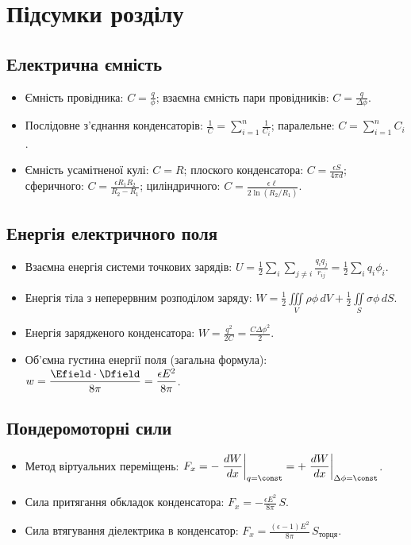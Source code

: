 \section{Підсумки розділу}

\subsection*{Електрична ємність}
\begin{itemize}
	\item Ємність провідника: $\displaystyle C = \frac{q}{\phi}$; взаємна ємність пари провідників: $\displaystyle C = \frac{q}{\Delta\phi}$.
	\item Послідовне з'єднання конденсаторів: $\displaystyle \frac1C = \sum\limits_{i=1}^n \frac1{C_i}$; паралельне: $\displaystyle C =
	      \sum\limits_{i=1}^n C_i$.
	\item Ємність усамітненої кулі: $C = R$; плоского конденсатора: $\displaystyle C = \frac{\epsilon S}{4\pi d}$; сферичного: $\displaystyle C =
	      \frac{\epsilon R_1R_2}{R_2-R_1}$; циліндричного: $\displaystyle C = \frac{\epsilon\ell}{2\ln(R_2/R_1)}$.
\end{itemize}

\subsection*{Енергія електричного поля}
\begin{itemize}
	\item Взаємна енергія системи точкових зарядів: $\displaystyle U = \frac12 \sum_{i}\sum_{j\neq i} \frac{q_iq_j}{r_{ij}} = \frac12\sum_i
	      q_i\phi_i$.
	\item Енергія тіла з неперервним розподілом заряду: $\displaystyle W = \frac12\iiint\limits_V \rho\phi\, dV + \frac12\iint\limits_S \sigma\phi\,
	      dS$.
	\item Енергія зарядженого конденсатора: $\displaystyle W = \frac{q^2}{2C} = \frac{C\Delta\phi^2}{2}$.
	\item Об'ємна густина енергії поля (загальна формула): $\displaystyle w = \frac{\Efield\cdot\Dfield}{8\pi} = \frac{\epsilon E^2}{8\pi}$.
\end{itemize}

\subsection*{Пондеромоторні сили}
\begin{itemize}
	\item Метод віртуальних переміщень: $\displaystyle F_x = -\left.\frac{dW}{dx}\right|_{q=\const} = +\left.\frac{dW}{dx}\right|_{\Delta\phi=\const}$.
	\item Сила притягання обкладок конденсатора: $\displaystyle F_x = -\frac{\epsilon E^2}{8\pi}\, S$.
	\item Сила втягування діелектрика в конденсатор: $\displaystyle F_x = \frac{(\epsilon-1)E^2}{8\pi}\, S_\text{торця}$.
\end{itemize}

